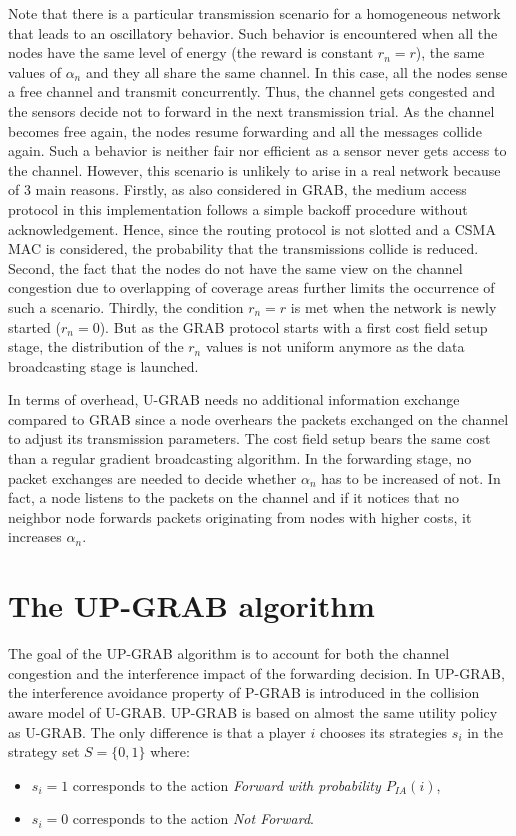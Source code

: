 \documentclass[journal, peerreview, onecolumn, draftcls]{IEEEtran}
\begin{document}
Note that there is a particular transmission scenario for a homogeneous network that leads to an oscillatory behavior. Such behavior is encountered when all the nodes have the same level of energy (the reward is constant $r_n=r$), the same values of $\alpha_n$ and they all share the same channel. In this case, all the nodes sense a free channel and transmit concurrently. Thus, the channel gets congested and the sensors decide not to forward in the next transmission trial. As the channel becomes free again, the nodes resume forwarding and all the messages collide again. Such a behavior is neither fair nor efficient as a sensor never gets access to the channel. However, this scenario is unlikely to arise in a real network because of 3 main reasons. Firstly, as also considered in GRAB, the medium access protocol in this implementation follows a simple backoff procedure without acknowledgement. Hence, since the routing protocol is not slotted and a CSMA MAC is considered, the probability that the transmissions collide is reduced. Second, the fact that the nodes do not have the same view on the channel congestion due to overlapping of coverage areas further limits the occurrence of such a scenario. Thirdly, the condition $r_n=r$ is met when the network is newly started ($r_n=0$). But as the GRAB protocol starts with a first cost field setup stage, the distribution of the $r_n$ values is not uniform anymore as the data broadcasting stage is launched.

In terms of overhead, U-GRAB needs no additional information exchange compared to GRAB since a node overhears the packets exchanged on the channel to adjust its transmission parameters. The cost field setup bears the same cost than a regular gradient broadcasting algorithm. In the forwarding stage, no packet exchanges are needed to decide whether $\alpha_n$ has to be increased of not. In fact, a node listens to the packets on the channel and if it notices that no neighbor node forwards packets originating from nodes with higher costs, it increases $\alpha_n$.

\section{The UP-GRAB algorithm}\label{sec:PGGRAB}

The goal of the UP-GRAB algorithm is to account for both the channel congestion and the interference impact of the forwarding decision. In UP-GRAB, the interference avoidance property of P-GRAB is introduced in the collision aware model of U-GRAB.
UP-GRAB is based on almost the same utility policy as U-GRAB. The only difference is that a player $i$ chooses its strategies $s_i$ in the strategy set $S =\{0, 1\}$ where:
\begin{itemize}
\item $s_i=1$ corresponds to the action {\it Forward with probability $P_{IA}(i)$},
\item $s_i=0$ corresponds to the action {\it Not Forward}.
\end{itemize}
\end{document}

